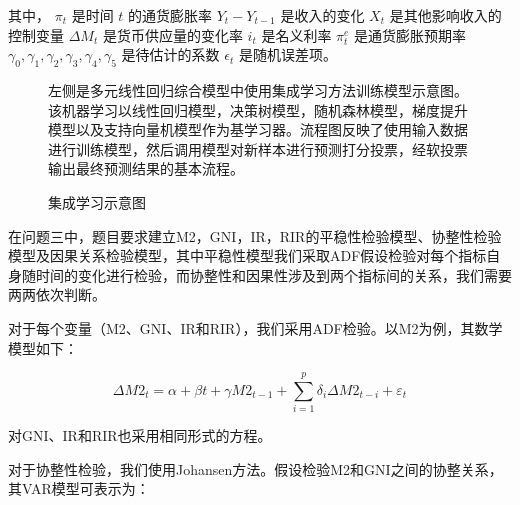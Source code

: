 其中，
$\pi_t$ 是时间 $t$ 的通货膨胀率
$Y_t - Y_{t-1}$ 是收入的变化
$X_t$ 是其他影响收入的控制变量
$\Delta M_t$ 是货币供应量的变化率
$i_t$ 是名义利率
$\pi_t^e$ 是通货膨胀预期率
$\gamma_0, \gamma_1, \gamma_2, \gamma_3, \gamma_4, \gamma_5$ 是待估计的系数
$\epsilon_t$ 是随机误差项。

\begin{figure}[h]
	\centering
	\begin{minipage}[t]{0.6\textwidth}
		\centering
		\caption{集成学习示意图}
		\label{fig:flowchart}
	\end{minipage}%
	\hspace*{0.5cm} %
	\begin{minipage}[t]{0.35\textwidth}
		\raggedright %
		\vspace{-7cm} %
		左侧是多元线性回归综合模型中使用集成学习方法训练模型示意图。该机器学习以线性回归模型，决策树模型，随机森林模型，梯度提升模型以及支持向量机模型作为基学习器。流程图反映了使用输入数据进行训练模型，然后调用模型对新样本进行预测打分投票，经软投票输出最终预测结果的基本流程。
		\par %
	\end{minipage}
\end{figure}



在问题三中，题目要求建立M2，GNI，IR，RIR的平稳性检验模型、协整性检验模型及因果关系检验模型，其中平稳性模型我们采取ADF假设检验对每个指标自身随时间的变化进行检验，而协整性和因果性涉及到两个指标间的关系，我们需要两两依次判断。


对于每个变量（M2、GNI、IR和RIR），我们采用ADF检验。以M2为例，其数学模型如下：

\begin{equation}
	\Delta M2_t = \alpha + \beta t + \gamma M2_{t-1} + \sum_{i=1}^{p} \delta_i \Delta M2_{t-i} + \varepsilon_t
\end{equation}

对GNI、IR和RIR也采用相同形式的方程。


对于协整性检验，我们使用Johansen方法。假设检验M2和GNI之间的协整关系，其VAR模型可表示为：


